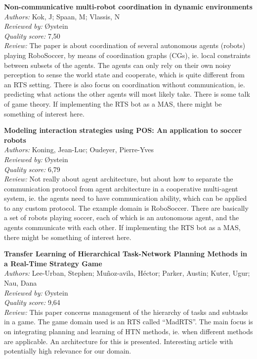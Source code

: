 {\textbf{Non-communicative multi-robot coordination in dynamic environments\cite{kok2005non}}\\
\textit{Authors:} Kok, J; Spaan, M; Vlassis, N\\
\textit{Reviewed by:} {\O}ystein\\
\textit{Quality score:} 7,50\\
\textit{Review:} The paper is about coordination of several autonomous agents (robots) playing RoboSoccer, by means of coordination graphs (CGs), ie. local constraints between subsets of the agents. The agents can only rely on their own noisy perception to sense the world state and cooperate, which is quite different from an RTS setting. There is also focus on coordination without communication, ie. predicting what actions the other agents will most likely take. There is some talk of game theory.  If implementing the RTS bot as a MAS, there might be something of interest here.

\textbf{Modeling interaction strategies using POS: An application to soccer robots\cite{koning2006modeling}}\\
\textit{Authors:} Koning, Jean-Luc; Oudeyer, Pierre-Yves\\
\textit{Reviewed by:} {\O}ystein\\
\textit{Quality score:} 6,79\\
\textit{Review:} Not really about agent architecture, but about how to separate the communication protocol from agent architecture in a cooperative multi-agent system, ie. the agents need to have communication ability, which can be applied to any custom protocol. The example domain is RoboSoccer. There are basically a set of robots playing soccer, each of which is an autonomous agent, and the agents communicate with each other. If implementing the RTS bot as a MAS, there might be something of interest here.

\textbf{Transfer Learning of Hierarchical Task-Network Planning Methods in a Real-Time Strategy Game\cite{lee2007transfer}}\\
\textit{Authors:} Lee-Urban, Stephen; Mu\~{n}oz-avila, H\'{e}ctor; Parker, Austin; Kuter, Ugur; Nau, Dana\\
\textit{Reviewed by:} {\O}ystein\\
\textit{Quality score:} 9,64\\
\textit{Review:} This paper concerns management of the hierarchy of tasks and subtasks in a game. The game domain used is an RTS called ``MadRTS''. The main focus is on integrating planning and learning of HTN methods, ie. when different methods are applicable. An architecture for this is presented. Interesting article with potentially high relevance for our domain.

}
